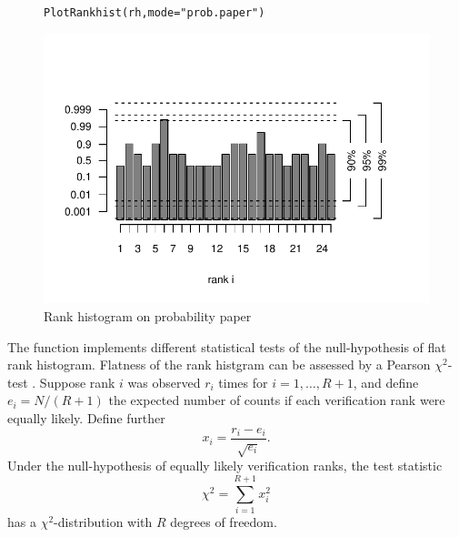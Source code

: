 \documentclass[article]{jss}\usepackage[]{graphicx}\usepackage[]{color}
\makeatletter
\def\maxwidth{ %
  \ifdim\Gin@nat@width>\linewidth
    \linewidth
  \else
    \Gin@nat@width
  \fi
}
\newcommand{\hlstr}[1]{\textcolor[rgb]{0.651,0.522,0}{#1}}%
\newcommand{\hlstd}[1]{\textcolor[rgb]{0,0,0}{#1}}%
\newcommand{\hlkwc}[1]{\textcolor[rgb]{0,0.502,0.753}{#1}}%
\newcommand{\hlkwd}[1]{\textcolor[rgb]{0,0.267,0.4}{#1}}%
\newenvironment{kframe}{%
 \def\at@end@of@kframe{}%
 \ifinner\ifhmode%
  \def\at@end@of@kframe{\end{minipage}}%
  \begin{minipage}{\columnwidth}%
 \fi\fi%
 \def\FrameCommand##1{\hskip\@totalleftmargin \hskip-\fboxsep
 \colorbox{shadecolor}{##1}\hskip-\fboxsep
     \hskip-\linewidth \hskip-\@totalleftmargin \hskip\columnwidth}%
 \MakeFramed {\advance\hsize-\width
   \@totalleftmargin\z@ \linewidth\hsize
   \@setminipage}}%
 {\par\unskip\endMakeFramed%
 \at@end@of@kframe}
\newenvironment{knitrout}{}{} %
\makeatother
\begin{document}
\begin{figure}
\begin{center}
%
\begin{knitrout}
\color{fgcolor}\begin{kframe}
\begin{alltt}
\hlkwd{PlotRankhist}\hlstd{(rh,} \hlkwc{mode}\hlstd{=}\hlstr{"prob.paper"}\hlstd{)}
\end{alltt}
\end{kframe}
\includegraphics[width=\maxwidth]{figure/rank-hist-pp-1} 

\end{knitrout}
%
\end{center}
\caption{Rank histogram on probability paper}
\label{fig:rank-hist-pp}
\end{figure}


The function  implements different statistical tests of the null-hypothesis of flat rank histogram.
Flatness of the rank histgram can be assessed by a Pearson $\chi^2$-test \citep{pearson1900criterion}.
Suppose rank $i$ was observed $r_i$ times for $i=1,\dots,R+1$, and define $e_i=N/(R+1)$ the expected number of counts if each verification rank were equally likely.
Define further
\begin{equation}
x_i = \frac{r_i - e_i}{\sqrt{e_i}}.
\end{equation}
%
Under the null-hypothesis of equally likely verification ranks, the test statistic
%
\begin{equation}
\chi^2 = \sum_{i=1}^{R+1} x_i^2
\end{equation}
%
has a $\chi^2$-distribution with $R$ degrees of freedom.
\end{document}
